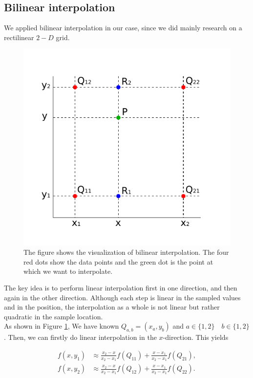     \subsection{Bilinear interpolation}
    We applied bilinear interpolation in our case, since we did mainly research on a rectilinear $2-D$ grid.
    \begin{figure}
        \centering
        \includegraphics[scale = 0.8]{Figures/inp}
        \caption{The figure shows the visualization of bilinear interpolation. The four red dots show the data points and the green dot is the point at which we want to interpolate.}
        \label{fig:1}
    \end{figure}
    The key idea is to perform linear interpolation first in one direction, and then again in the other direction. Although each step is linear in the sampled values and in the position, the interpolation as a whole is not linear but rather quadratic in the sample location. \\

    As shown in Figure \ref{fig:1}, We have known $Q_{a, b} = (x_a, y_ b)$ and $a\in\{1, 2\}\quad b\in\{1,2\}$. Then, we can firstly do linear interpolation in the $x$-direction. This yields

    \begin{subequations}
        \begin{align}
            f(x,y_{1})&\approx {\frac {x_{2}-x}{x_{2}-x_{1}}}f(Q_{11})+{\frac {x-x_{1}}{x_{2}-x_{1}}}f(Q_{21}),\\
            f(x,y_{2})&\approx {\frac {x_{2}-x}{x_{2}-x_{1}}}f(Q_{12})+{\frac {x-x_{1}}{x_{2}-x_{1}}}f(Q_{22}).
        \end{align}
        \label{eq:2}
    \end{subequations}

